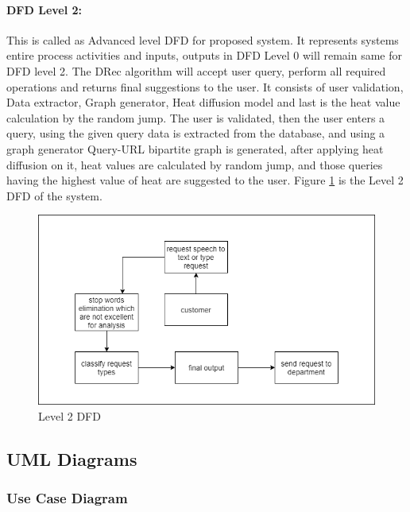 \paragraph{DFD Level 2: }This is called as Advanced level DFD for proposed system. It represents systems entire process activities and inputs, outputs in DFD Level 0 will remain same for DFD level 2. The DRec algorithm will accept user query, perform all required operations and returns final suggestions to the user. It consists of user validation, Data extractor, Graph generator, Heat diffusion model and last is the heat value calculation by the random jump. The user is validated, then the user enters a query, using the given query data is extracted from the database, and using a graph generator Query-URL bipartite graph is generated, after applying heat diffusion on it, heat values are calculated by random jump, and those queries having the highest value of heat are suggested to the user. Figure \ref{fig:DFD2} is the Level 2 DFD of the system.
\begin{figure}[!h]
	\centering
	\includegraphics[scale=.725]{./dfd2}
	\caption{Level 2 DFD}
	\label{fig:DFD2}
\end{figure}
\newpage
\subsection{UML Diagrams}
\subsubsection{Use Case Diagram}
